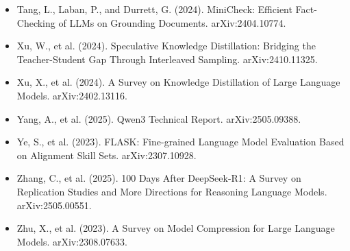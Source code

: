 \documentclass[11pt]{article}
\begin{document}
\begin{itemize}
\item Tang, L., Laban, P., and Durrett, G. (2024). MiniCheck: Efficient Fact-Checking of LLMs on Grounding Documents. arXiv:2404.10774.
\item Xu, W., et al. (2024). Speculative Knowledge Distillation: Bridging the Teacher-Student Gap Through Interleaved Sampling. arXiv:2410.11325.
\item Xu, X., et al. (2024). A Survey on Knowledge Distillation of Large Language Models. arXiv:2402.13116.
\item Yang, A., et al. (2025). Qwen3 Technical Report. arXiv:2505.09388.
\item Ye, S., et al. (2023). FLASK: Fine-grained Language Model Evaluation Based on Alignment Skill Sets. arXiv:2307.10928.
\item Zhang, C., et al. (2025). 100 Days After DeepSeek-R1: A Survey on Replication Studies and More Directions for Reasoning Language Models. arXiv:2505.00551.
\item Zhu, X., et al. (2023). A Survey on Model Compression for Large Language Models. arXiv:2308.07633.
\end{itemize}
\endgroup
\end{document}
